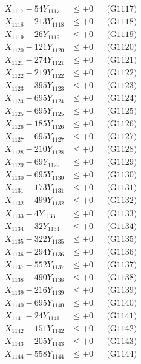 \documentclass[a4paper,10pt]{article}
\begin{document}
{\begin{align}
X_{1117} - 54Y_{1117} &\leq +0 && \text{(G1117)} \\
X_{1118} - 213Y_{1118} &\leq +0 && \text{(G1118)} \\
X_{1119} - 26Y_{1119} &\leq +0 && \text{(G1119)} \\
X_{1120} - 121Y_{1120} &\leq +0 && \text{(G1120)} \\
\allowbreak
X_{1121} - 274Y_{1121} &\leq +0 && \text{(G1121)} \\
X_{1122} - 219Y_{1122} &\leq +0 && \text{(G1122)} \\
X_{1123} - 395Y_{1123} &\leq +0 && \text{(G1123)} \\
X_{1124} - 695Y_{1124} &\leq +0 && \text{(G1124)} \\
X_{1125} - 695Y_{1125} &\leq +0 && \text{(G1125)} \\
X_{1126} - 185Y_{1126} &\leq +0 && \text{(G1126)} \\
X_{1127} - 695Y_{1127} &\leq +0 && \text{(G1127)} \\
X_{1128} - 210Y_{1128} &\leq +0 && \text{(G1128)} \\
X_{1129} - 69Y_{1129} &\leq +0 && \text{(G1129)} \\
X_{1130} - 695Y_{1130} &\leq +0 && \text{(G1130)} \\
\allowbreak
X_{1131} - 173Y_{1131} &\leq +0 && \text{(G1131)} \\
X_{1132} - 499Y_{1132} &\leq +0 && \text{(G1132)} \\
X_{1133} - 4Y_{1133} &\leq +0 && \text{(G1133)} \\
X_{1134} - 32Y_{1134} &\leq +0 && \text{(G1134)} \\
X_{1135} - 322Y_{1135} &\leq +0 && \text{(G1135)} \\
X_{1136} - 294Y_{1136} &\leq +0 && \text{(G1136)} \\
X_{1137} - 552Y_{1137} &\leq +0 && \text{(G1137)} \\
X_{1138} - 490Y_{1138} &\leq +0 && \text{(G1138)} \\
X_{1139} - 216Y_{1139} &\leq +0 && \text{(G1139)} \\
X_{1140} - 695Y_{1140} &\leq +0 && \text{(G1140)} \\
\allowbreak
X_{1141} - 24Y_{1141} &\leq +0 && \text{(G1141)} \\
X_{1142} - 151Y_{1142} &\leq +0 && \text{(G1142)} \\
X_{1143} - 205Y_{1143} &\leq +0 && \text{(G1143)} \\
X_{1144} - 558Y_{1144} &\leq +0 && \text{(G1144)} \\

\end{align}}
\end{document}

